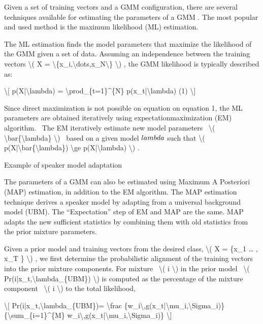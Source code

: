 \documentclass[letterpaper,10pt,english]{jupyterBook}
\begin{document}
\sphinxAtStartPar
Given a set of training vectors and a GMM configuration, there are
several techniques available for estimating the parameters of a GMM .
The most popular and used method is the maximum likelihood (ML)
estimation.

\sphinxAtStartPar
The ML estimation finds the model parameters that maximize the
likelihood of the GMM given a set of data. Assuming an independence
between the training vectors \textbackslash{}( X = \textbackslash{}\{x\_i,\textbackslash{}dots,x\_N\textbackslash{}\} \textbackslash{}) , the GMM
likelihood is typically described as:

\sphinxAtStartPar
\textbackslash{}{[} p(X|\textbackslash{}lambda) = \textbackslash{}prod\_\{t=1\}\textasciicircum{}\{N\} p(x\_t|\textbackslash{}lambda) (1) \textbackslash{}{]}

\sphinxAtStartPar
Since direct maximization is not possible on equation on equation 1, the
ML parameters are obtained iteratively using expectation\sphinxhyphen{}maximization
(EM) algorithm.  The EM iteratively estimate new model parameters  \textbackslash{}(
\textbackslash{}bar\{\textbackslash{}lambda\} \textbackslash{})  based on a given model \(\\lambda\) such that \textbackslash{}(
p(X|\textbackslash{}bar\{\textbackslash{}lambda\}) \textbackslash{}ge p(X|\textbackslash{}lambda) \textbackslash{}) .

\sphinxAtStartPar
Example of
speaker model adaptation

\sphinxAtStartPar
The parameters of a GMM can also be estimated using Maximum A Posteriori
(MAP) estimation, in addition to the EM algorithm. The MAP estimation
technique derives a speaker model by adapting from a universal
background model (UBM). The “Expectation” step of EM and MAP are the
same. MAP adapts the new sufficient statistics by combining them with
old statistics from the prior mixture parameters.

\sphinxAtStartPar
Given a prior model and training vectors from the desired class, \textbackslash{}( X =
\{x\_1 … , x\_T \} \textbackslash{}) , we first determine the probabilistic alignment
of the training vectors into the prior mixture components. For mixture 
\textbackslash{}( i \textbackslash{}) in the prior model  \textbackslash{}( Pr(i|x\_t,\textbackslash{}lambda\_\{UBM\}) \textbackslash{}) is
computed as the percentage of the mixture component  \textbackslash{}( i \textbackslash{}) to the
total likelihood,

\sphinxAtStartPar
\textbackslash{}{[} Pr(i|x\_t,\textbackslash{}lambda\_\{UBM\})= \textbackslash{}frac \{w\_i\textbackslash{},g(x\_t|\textbackslash{}mu\_i,\textbackslash{}Sigma\_i)\}
\{\textbackslash{}sum\_\{i=1\}\textasciicircum{}\{M\} w\_i\textbackslash{},g(x\_t|\textbackslash{}mu\_i,\textbackslash{}Sigma\_i)\} \textbackslash{}{]}
\end{document}
